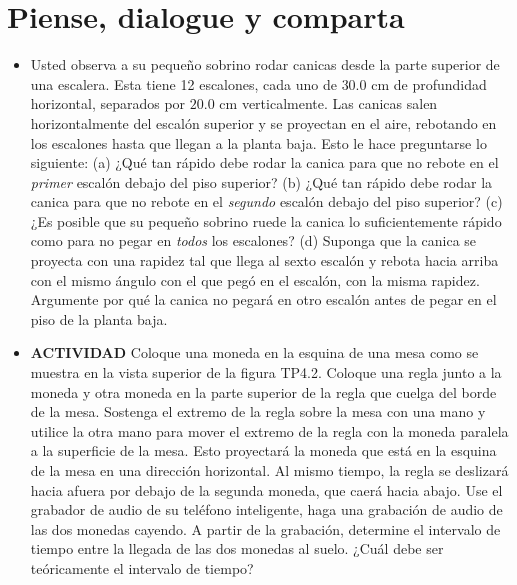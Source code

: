 \documentclass[11pt,a4paper]{article}
\begin{document}
\section*{Piense, dialogue y comparta}

\begin{itemize}
    \item[\textbf{1.}] Usted observa a su pequeño sobrino rodar canicas desde la parte superior de una escalera. Esta tiene 12 escalones, cada uno de $30.0 \text{ cm}$ de profundidad horizontal, separados por $20.0 \text{ cm}$ verticalmente. Las canicas salen horizontalmente del escalón superior y se proyectan en el aire, rebotando en los escalones hasta que llegan a la planta baja. Esto le hace preguntarse lo siguiente: (a) ¿Qué tan rápido debe rodar la canica para que no rebote en el \textit{primer} escalón debajo del piso superior? (b) ¿Qué tan rápido debe rodar la canica para que no rebote en el \textit{segundo} escalón debajo del piso superior? (c) ¿Es posible que su pequeño sobrino ruede la canica lo suficientemente rápido como para no pegar en \textit{todos} los escalones? (d) Suponga que la canica se proyecta con una rapidez tal que llega al sexto escalón y rebota hacia arriba con el mismo ángulo con el que pegó en el escalón, con la misma rapidez. Argumente por qué la canica no pegará en otro escalón antes de pegar en el piso de la planta baja.
    \vspace*{9cm}

    \item[\textbf{2.}] \textbf{ACTIVIDAD} Coloque una moneda en la esquina de una mesa como se muestra en la vista superior de la figura TP4.2. Coloque una regla junto a la moneda y otra moneda en la parte superior de la regla que cuelga del borde de la mesa. Sostenga el extremo de la regla sobre la mesa con una mano y utilice la otra mano para mover el extremo de la regla con la moneda paralela a la superficie de la mesa. Esto proyectará la moneda que está en la esquina de la mesa en una dirección horizontal. Al mismo tiempo, la regla se deslizará hacia afuera por debajo de la segunda moneda, que caerá hacia abajo. Use el grabador de audio de su teléfono inteligente, haga una grabación de audio de las dos monedas cayendo. A partir de la grabación, determine el intervalo de tiempo entre la llegada de las dos monedas al suelo. ¿Cuál debe ser teóricamente el intervalo de tiempo?
    \vspace*{8cm}
\end{itemize}

\newpage
\end{document}
